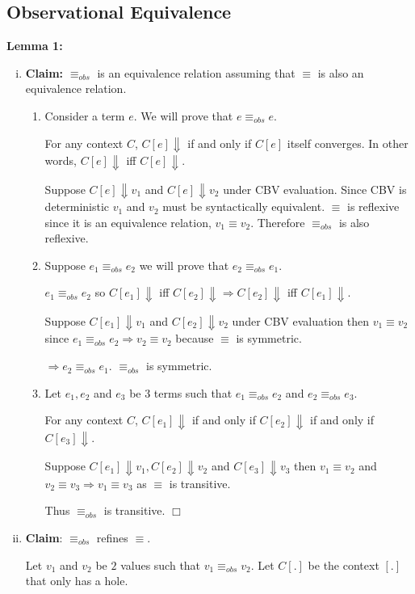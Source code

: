 \documentclass[10pt]{article}
\newcommand{\problem}[1]{\subsection*{\sf #1}}
\begin{document}
\problem{1 Observational Equivalence}

\textbf{Lemma 1:}
\begin{enumerate}[(i)]
\item \textbf{Claim: } $\equiv_{obs}$ is an equivalence relation assuming that $\equiv$ is also an equivalence relation.

\begin{enumerate}
\item Consider a term $e$. We will prove that $e \equiv_{obs} e$.

For any context $C$, $C[e] \Downarrow$ if and only if $C[e]$ itself converges. In other words,  $C[e] \Downarrow$ iff  $C[e] \Downarrow$.

Suppose $C[e] \Downarrow v_1$ and $C[e] \Downarrow v_2$ under CBV evaluation. Since CBV is deterministic $v_1$ and $v_2$ must be syntactically equivalent. $\equiv$ is reflexive since it is an equivalence relation, $v_1 \equiv v_2$. Therefore $\equiv_{obs}$ is also reflexive.
\item Suppose $e_1 \equiv_{obs} e_2$ we will prove that $e_2 \equiv_{obs} e_1$.

$e_1 \equiv_{obs} e_2$ so $C[e_1] \Downarrow$ iff $C[e_2] \Downarrow \Rightarrow C[e_2] \Downarrow$ iff $C[e_1] \Downarrow$.

Suppose $C[e_1] \Downarrow v_1$ and $C[e_2] \Downarrow v_2$ under CBV evaluation then $v_1 \equiv v_2$ since $e_1 \equiv_{obs} e_2 \Rightarrow v_2 \equiv v_2$ because $\equiv$ is symmetric.

$\Rightarrow e_2 \equiv_{obs} e_1$. $\equiv_{obs}$ is symmetric.
\item Let $e_1, e_2$ and $e_3$ be $3$ terms such that $e_1 \equiv_{obs} e_2$ and $e_2 \equiv_{obs} e_3$.

For any context $C$, $C[e_1] \Downarrow$ if and only if $C[e_2] \Downarrow$ if and only if $C[e_3] \Downarrow$.

Suppose $C[e_1] \Downarrow v_1, C[e_2] \Downarrow v_2$ and $C[e_3] \Downarrow v_3$ then $v_1 \equiv v_2$ and $v_2 \equiv v_3 \Rightarrow v_1 \equiv v_3$ as $\equiv$ is transitive.

Thus $\equiv_{obs}$ is transitive. $\Box$
\end{enumerate}
\item \textbf{Claim}: $\equiv_{obs}$ refines $\equiv$.

Let $v_1$ and $v_2$ be $2$ values such that $v_1 \equiv_{obs} v_2$. Let $C[.]$ be the context $[.]$ that only has a hole.


\end{enumerate}
\end{document}
